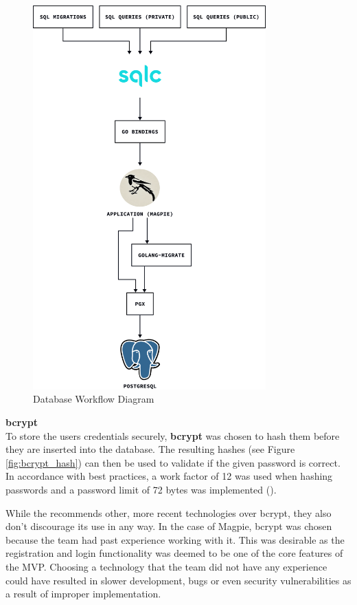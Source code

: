 \begin{figure}[htbp]
  \centering{}
  \includegraphics[width=0.8\textwidth]{../d2-diagrams/database-workflow/database_workflow.png}
  \caption{Database Workflow Diagram}
  \label{fig:database_workflow_diagram}
\end{figure}

\textbf{bcrypt}\\
To store the users credentials securely, \textbf{bcrypt} was chosen to hash them
before they are inserted into the database. The resulting hashes (see Figure
\ref{fig:bcrypt_hash}) can then be used to validate if the given password is
correct. In accordance with best practices, a work factor of 12 was used when
hashing passwords and a password limit of 72 bytes was implemented
(\cite{owasp_password_storage_cheatsheet}).

While the \textcite{owasp_password_storage_cheatsheet} recommends other, more
recent technologies over bcrypt, they also don't discourage its use in any way.
In the case of Magpie, bcrypt was chosen because the team had past experience
working with it. This was desirable as the registration and login functionality
was deemed to be one of the core features of the MVP. Choosing a technology that
the team did not have any experience could have resulted in slower development,
bugs or even security vulnerabilities as a result of improper implementation.

